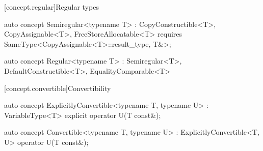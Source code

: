 \documentclass[american,twoside]{book}
\begin{document}
\begin{itemdescr}
\pnum
{}
\end{itemdescr}

[concept.regular]{Regular types}

\begin{itemdecl}
auto concept Semiregular<typename T> : CopyConstructible<T>, CopyAssignable<T>, FreeStoreAllocatable<T> { 
  requires SameType<CopyAssignable<T>::result_type, T&>;
}
\end{itemdecl}

\begin{itemdescr}
\pnum 
{}
\end{itemdescr}

\begin{itemdecl}
auto concept Regular<typename T> 
  : Semiregular<T>, DefaultConstructible<T>, EqualityComparable<T> { }
\end{itemdecl}

\begin{itemdescr}
\pnum
{}
\end{itemdescr}

[concept.convertible]{Convertibility}

\begin{itemdecl}
auto concept ExplicitlyConvertible<typename T, typename U> : VariableType<T> {
  explicit operator U(T const&);
}
\end{itemdecl}

\begin{itemdescr}
\pnum
{}
\end{itemdescr}

\begin{itemdecl}
auto concept Convertible<typename T, typename U> : ExplicitlyConvertible<T, U> {
  operator U(T const&);
}
\end{itemdecl}

\begin{itemdescr}
\pnum
{}
\end{itemdescr}
\end{document}
